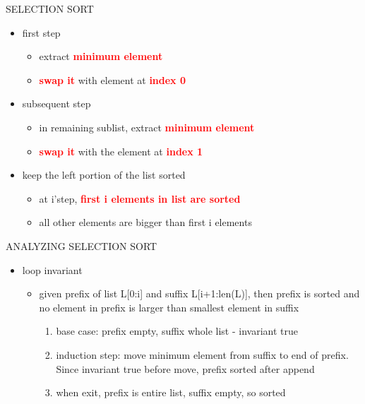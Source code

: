 \documentclass[aspectratio=169]{beamer}
\begin{document}
\begin{frame}{SELECTION SORT}
\begin{itemize}
\item first step
\begin{itemize}
\item extract \textcolor{red}{\textbf{minimum element}}
\item \textcolor{red}{\textbf{swap it}} with element at \textcolor{red}{\textbf{index 0}}
\end{itemize}
\item subsequent step
\begin{itemize}
\item in remaining sublist, extract \textcolor{red}{\textbf{minimum element}}
\item \textcolor{red}{\textbf{swap it}} with the element at \textcolor{red}{\textbf{index 1}}
\end{itemize}
\item keep the left portion of the list sorted
\begin{itemize}
\item at i'step, \textcolor{red}{\textbf{first i elements in list are sorted}}
\item all other elements are bigger than first i elements
\end{itemize}
\end{itemize}
\end{frame}


\begin{frame}{ANALYZING SELECTION SORT}
\begin{itemize}
\item loop invariant
\begin{itemize}
\item given prefix of list L[0:i] and suffix L[i+1:len(L)], then prefix is sorted and no element in prefix is larger than smallest element in suffix
\begin{enumerate}
\item  base case: prefix empty, suffix whole list - invariant true
\item  induction step: move minimum element from suffix to end of prefix. Since invariant true before move, prefix sorted after append
\item when exit, prefix is entire list, suffix empty, so sorted
\end{enumerate}
\end{itemize}
\end{itemize}
\end{frame}
\end{document}
